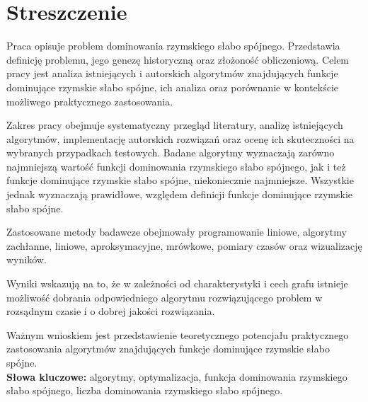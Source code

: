 \chapter*{Streszczenie}
Praca opisuje problem dominowania rzymskiego słabo spójnego. Przedstawia definicję problemu, jego genezę historyczną oraz złożoność obliczeniową. Celem pracy jest analiza istniejących i autorskich algorytmów znajdujących funkcje dominujące rzymskie słabo spójne, ich analiza oraz porównanie w kontekście możliwego praktycznego zastosowania.

Zakres pracy obejmuje systematyczny przegląd literatury, analizę istniejących algorytmów, implementację autorskich rozwiązań oraz ocenę ich skuteczności na wybranych przypadkach testowych. Badane algorytmy wyznaczają zarówno najmniejszą wartość funkcji dominowania rzymskiego słabo spójnego, jak i też funkcje dominujące rzymskie słabo spójne, niekoniecznie najmniejsze. Wszystkie jednak wyznaczają prawidłowe, względem definicji funkcje dominujące rzymskie słabo spójne.

Zastosowane metody badawcze obejmowały programowanie liniowe, algorytmy zachłanne, liniowe, aproksymacyjne, mrówkowe, pomiary czasów oraz wizualizację wyników.

Wyniki wskazują na to, że w zależności od charakterystyki i cech grafu istnieje możliwość dobrania odpowiedniego algorytmu rozwiązującego problem w rozsądnym czasie i o dobrej jakości rozwiązania.

Ważnym wnioskiem jest przedstawienie teoretycznego potencjału praktycznego zastosowania algorytmów znajdujących funkcje dominujące rzymskie słabo spójne.\\

\textbf{Słowa kluczowe:} algorytmy, optymalizacja, funkcja dominowania rzymskiego słabo spójnego, liczba dominowania rzymskiego słabo spójnego.
